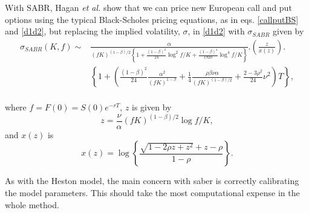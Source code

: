 With SABR, Hagan \textit{et al.} show that we can price new European call and put options using the typical Black-Scholes pricing equations, as in eqs. \eqref{callputBS} and \eqref{d1d2}, but replacing the implied volatility, $\sigma$, in \eqref{d1d2} with $\sigma_{SABR}$ given by
\begin{equation}\label{SABRImpvol}
\begin{split}
\sigma_{SABR}(K,f)\sim&\frac{\alpha}{\left(fK\right)^{(1-\beta)/2}\left\{1+\frac{(1-\beta)^2}{24}\log^2f/K+\frac{(1-\beta)^4}{1920}\log^4f/K\right\}}.\left(\frac{z}{x(z)}\right).\\
&\left\{1+\left(\frac{(1-\beta)^2}{24}\frac{\alpha^2}{\left(fK\right)^{1-\beta}}+\frac{1}{4}\frac{\rho\beta\nu\alpha}{\left(fK\right)^{(1-\beta)/2}}+\frac{2-3\rho^2}{24}\nu^2\right)T\right\},\\
\end{split}
\end{equation}

\noindent where $f=F(0)=S(0)e^{-rT}$, $z$ is given by
\begin{equation}
z=\frac{\nu}{\alpha}\left(fK\right)^{(1-\beta)/2}\log f/K,
\end{equation}
\noindent and $x(z)$ is
\begin{equation}
x(z)=\log\left\{\frac{\sqrt{1-2\rho z+z^2}+z-\rho}{1-\rho}\right\}.
\end{equation}

As with the Heston model, the main concern with saber is correctly calibrating the model parameters. This should take the most computational expense in the whole method.